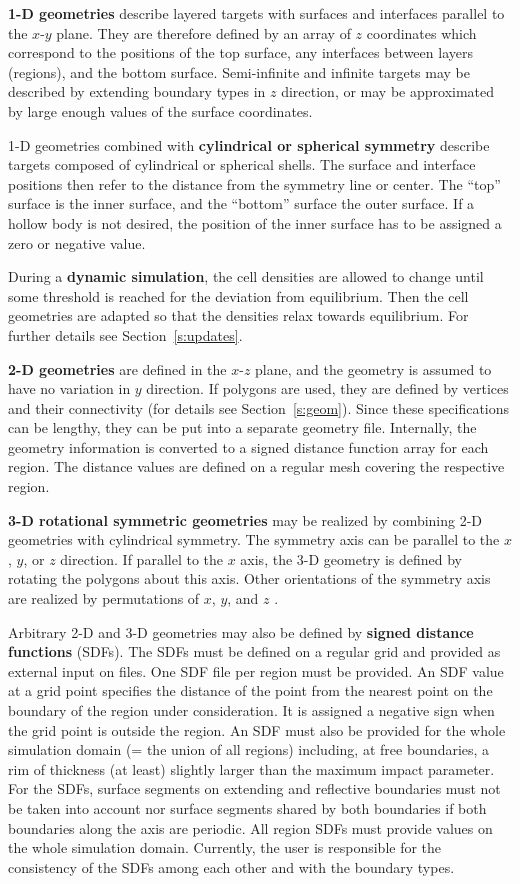 \textbf{1-D geometries} describe layered targets with surfaces and interfaces
parallel to the $x$-$y$ plane. 
They are therefore defined by an array of $z$ coordinates which correspond to 
the positions of the top surface, any interfaces between layers (regions), 
and the bottom surface. 
Semi-infinite and infinite targets may be described by extending boundary 
types in $z$ direction, or may be approximated by large enough values of the 
surface coordinates. 

1-D geometries combined with \textbf{cylindrical or spherical symmetry} 
describe targets composed of cylindrical or spherical shells. 
The surface and interface positions then refer to the distance from the 
symmetry line or center. 
The ``top'' surface is the inner surface, and the ``bottom'' surface the 
outer surface. 
If a hollow body is not desired, the position of the inner surface has
to be assigned a zero or negative value.

During a \textbf{dynamic simulation}, the cell densities are allowed to change
until some threshold is reached for the deviation from equilibrium. 
Then the cell geometries are adapted so that the densities relax towards 
equilibrium. 
For further details see Section~\ref{s:updates}.

\textbf{2-D geometries} are defined in the $x$-$z$ plane, and the geometry 
is assumed to have no variation in $y$ direction.
If polygons are used, they are defined by vertices and their connectivity 
(for details see Section~\ref{s:geom}). 
Since these specifications can be lengthy, they can be put into a separate 
geometry file. 
Internally, the geometry information is converted to a signed distance 
function array for each region. 
The distance values are defined on a regular mesh covering the respective 
region.

\textbf{3-D rotational symmetric geometries} may be realized by combining 2-D
geometries with cylindrical symmetry. 
The symmetry axis can be parallel to the $x$, $y$, or $z$ direction.
If parallel to the $x$ axis, the 3-D geometry is defined by rotating the 
polygons about this axis.
Other orientations of the symmetry axis are realized by permutations of $x$,
$y$, and $z$ \cite{bradley_second_2021}.

Arbitrary 2-D and 3-D geometries may also be defined by \textbf{signed 
distance functions} (SDFs).
The SDFs must be defined on a regular grid and provided as external 
input on files. 
One SDF file per region must be provided.
An SDF value at a grid point specifies the distance of the point from the 
nearest point on the boundary of the region under consideration. 
It is assigned a negative sign when the grid point is outside the region. 
An SDF must also be provided for the whole simulation domain (= the union of 
all regions) including, at free boundaries, a rim of thickness (at least) 
slightly larger than the maximum impact parameter.
For the SDFs, surface segments on extending and reflective boundaries must
not be taken into account nor surface segments shared by both boundaries if 
both boundaries along the axis are periodic. 
All region SDFs must provide values on the whole simulation domain. 
Currently, the user is responsible for the consistency of the SDFs among each
other and with the boundary types.

